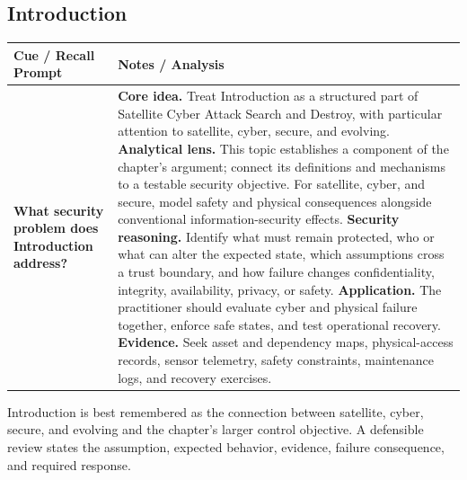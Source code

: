 \documentclass[11pt]{article}
\newcommand{\CornellHeader}{%
\rowcolor{Navy}\color{white}\bfseries Cue / Recall Prompt & \color{white}\bfseries Notes / Analysis\\\hline}
\newcommand{\CornellRow}[2]{%
\cellcolor{CueGray}\RaggedRight\textbf{#1} & \RaggedRight #2\\\hline}
\begin{document}
\subsection*{Introduction}
\begin{longtable}{>{\RaggedRight\arraybackslash}p{}|>{\RaggedRight\arraybackslash}p{}}
\CornellHeader
\CornellRow{What security problem does Introduction address?}{\textbf{Core idea.} Treat Introduction as a structured part of Satellite Cyber Attack Search and Destroy, with particular attention to satellite, cyber, secure, and evolving. \textbf{Analytical lens.} This topic establishes a component of the chapter's argument; connect its definitions and mechanisms to a testable security objective. For satellite, cyber, and secure, model safety and physical consequences alongside conventional information-security effects. \textbf{Security reasoning.} Identify what must remain protected, who or what can alter the expected state, which assumptions cross a trust boundary, and how failure changes confidentiality, integrity, availability, privacy, or safety. \textbf{Application.} The practitioner should evaluate cyber and physical failure together, enforce safe states, and test operational recovery. \textbf{Evidence.} Seek asset and dependency maps, physical-access records, sensor telemetry, safety constraints, maintenance logs, and recovery exercises.}
\end{longtable}
\begin{topicsummary}
Introduction is best remembered as the connection between satellite, cyber, secure, and evolving and the chapter's larger control objective. A defensible review states the assumption, expected behavior, evidence, failure consequence, and required response.
\end{topicsummary}
\end{document}
